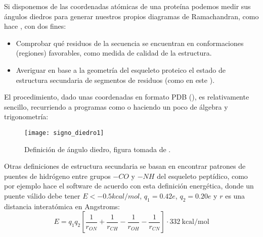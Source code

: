 Si disponemos de las coordenadas at\'{o}micas de una prote\'{i}na podemos medir sus \'{a}ngulos diedros 
para generar nuestros propios diagramas de Ramachandran, como hace 
, con dos fines:
\begin{itemize}
\item Comprobar qu\'{e} residuos de la secuencia se encuentran en conformaciones (regiones) favorables, como medida de calidad
de la estructura. 
\item Averiguar en base a la geometr\'{i}a del esqueleto proteico el estado de estructura secundaria de segmentos de residuos
(como en este ). 
\end{itemize}

El procedimiento, dado unas coordenadas en formato PDB (),
es relativamente sencillo, recurriendo a programas como 
o haciendo un poco de \'{a}lgebra y trigonometr\'{i}a:


\begin{figure}
\begin{center} 
\texttt{[image: signo\_diedro1]}
\caption%
{
Definici\'{o}n de \'{a}ngulo diedro, 
figura tomada de .
}
\label{fig:signo_diedro1}
\end{center}
\end{figure}


Otras definiciones de estructura secundaria se basan en encontrar patrones de puentes de 
hidr\'{o}geno entre grupos $-CO$ y $-NH$ del esqueleto pept\'{i}dico, 
como por ejemplo hace el software  \citep{Kabsch1983}
de acuerdo con esta definici\'{o}n energ\'{e}tica, donde un puente v\'{a}lido debe tener $E<-0{.}5 kcal/mol$, 
$q_{1}=0.42e$, $q_{2}=0.20e$ y $r$ es una distancia interat\'{o}mica en Angstroms:
\begin{equation}
E = q_{1} q_{2} \left[ \frac{1}{r_{ON}} + \frac{1}{r_{CH}} - \frac{1}{r_{OH}} - \frac{1}{r_{CN}} \right] \cdot 332 \ \mathrm{kcal/mol}
\label{eq:dssp}
\end{equation}

